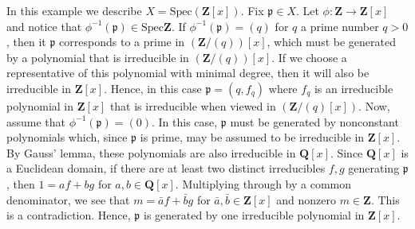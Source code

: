 \begin{example}
\label{example-spec-Zx}
In this example we describe $X = \text{Spec} (\mathbf{Z}[x])$.
Fix $\mathfrak p \in X$.
Let $\phi: \mathbf{Z} \to \mathbf{Z}[x]$ and notice
that $\phi^{-1}(\mathfrak p) \in \text{Spec} \mathbf{Z}$.
If $\phi^{-1}(\mathfrak p) = (q)$ for $q$ a prime number $q > 0$,
then it $\mathfrak p$ corresponds to a prime in $(\mathbf{Z}/(q))[x]$,
which must be generated by a polynomial that is irreducible in
$(\mathbf{Z}/(q))[x]$.   If we choose a representative of this polynomial
with minimal degree, then it will also be irreducible in $\mathbf{Z}[x]$.
Hence, in this case $\mathfrak p = (q, f_q)$ where $f_q$ is an irreducible
polynomial in $\mathbf{Z}[x]$ that is irreducible when viewed
in $(\mathbf{Z}/(q) [x])$. Now, assume that $\phi^{-1}(\mathfrak p) = (0)$.
In this case, $\mathfrak p$ must be generated by nonconstant polynomials
which, since $\mathfrak p$ is prime, may be assumed to be irreducible in
$\mathbf{Z}[x]$.  By Gauss' lemma, these polynomials are also irreducible
in $\mathbf{Q}[x]$.  Since $\mathbf{Q}[x]$ is a Euclidean domain, if there
are at least two distinct irreducibles $f, g$ generating $\mathfrak p$,
then $1 = af + bg$ for $a,b \in \mathbf{Q}[x]$.  Multiplying through by
a common denominator, we see that $m = \bar{a}f + \bar{b} g$ for
$\bar{a},\bar{b} \in \mathbf{Z}[x]$ and nonzero $m \in \mathbf{Z}$.
This is a contradiction.  Hence, $\mathfrak p$ is generated by one
irreducible polynomial in $\mathbf{Z}[x]$.
\end{example}

